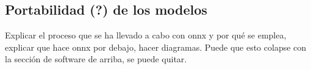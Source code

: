 





\subsection{Portabilidad (?) de los modelos}
Explicar el proceso que se ha llevado a cabo con onnx y por qué se emplea, explicar que hace onnx por debajo, hacer diagramas. Puede que esto colapse con la sección de software de arriba, se puede quitar.


\clearpage
